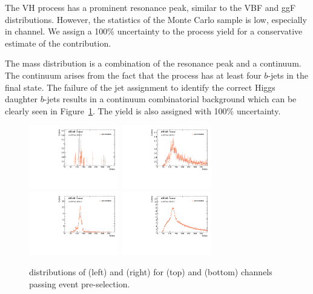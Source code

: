 The VH process has a prominent resonance peak, similar to the VBF and ggF distributions. However, 
the statistics of the Monte Carlo sample is low, especially in \twocentral channel. 
We assign a 100\% uncertainty to the \VH process yield for a conservative estimate of 
the \VH contribution. %

The \ttH mass distribution is a combination of the resonance peak and a continuum. 
The continuum arises from the fact that the \ttH process has at least four $b$-jets in the final state.
The failure of the jet assignment to identify the correct Higgs daughter $b$-jets results in a 
continuum combinatorial background which can be clearly seen in Figure~\ref{fig:Mbb-ttH-VH}. 
The yield is also assigned with 100\% uncertainty.


\begin{figure}[htbp]
  \centering
 \includegraphics[width=0.35\textwidth]{figures/VBF/Mbb_VH_2cen.pdf}
 \includegraphics[width=0.35\textwidth]{figures/VBF/Mbb_ttH_2cen.pdf}\\
 \includegraphics[width=0.35\textwidth]{figures/VBF/Mbb_VH_4cen.pdf}
 \includegraphics[width=0.35\textwidth]{figures/VBF/Mbb_ttH_4cen.pdf}
 \caption{\Mbb distributions of \VH (left) and \ttH (right) for \twocentral (top) and \fourcentral (bottom) channels passing event pre-selection. }
  \label{fig:Mbb-ttH-VH}
\end{figure}

